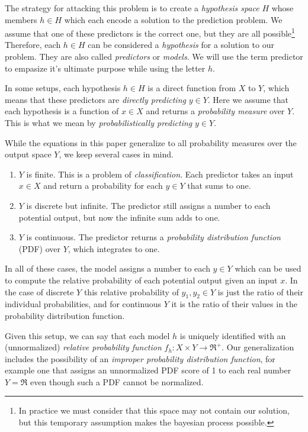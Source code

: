 \documentclass[twoside]{article}
\begin{document}
The strategy for attacking this problem is to create a \textit{hypothesis space} \(H\) whose members \(h \in H\) which each encode a solution to the prediction problem. We assume that one of these predictors is the correct one, but they are all possible\footnote{In practice we must consider that this space may not contain our solution, but this temporary assumption makes the bayesian process possible.} Therefore, each \(h \in H\) can be considered a \textit{hypothesis} for a solution to our problem. They are also called \textit{predictors} or \textit{models}. We will use the term predictor to empasize it's ultimate purpose while using the letter \(h\).

In some setups, each hypothesis \(h \in H\) is a direct function from \(X\) to \(Y\), which means that these predictors are \textit{directly predicting} \(y \in Y\). Here we assume that each hypothesis is a function of \(x \in X\) and returns a \textit{probability measure} over \(Y\). This is what we mean by \textit{probabilistically predicting} \(y \in Y\).

While the equations in this paper generalize to all probability measures over the output space \(Y\), we keep several cases in mind.
\begin{enumerate}
	\item \(Y\) is finite. This is a problem of \textit{classification}. Each predictor takes an input \(x \in X\) and return a probability for each \(y \in Y\) that sums to one.
	\item \(Y\) is discrete but infinite. The predictor still assigns a number to each potential output, but now the infinite sum adds to one.
	\item \(Y\) is continuous. The predictor returns a \textit{probability distribution function} (PDF) over \(Y\), which integrates to one.
\end{enumerate}

In all of these cases, the model assigns a number to each \(y \in Y\) which can be used to compute the relative probability of each potential output given an input \(x\). In the case of discrete \(Y\) this relative probability of \(y_1, y_2 \in Y\) is just the ratio of their individual probabilities, and for continuous \(Y\) it is the ratio of their values in the probability distribution function. 

Given this setup, we can say that each model \(h\) is uniquely identified with an (unnormalized) \textit{relative probability function} \(f_h: X \times Y \rightarrow \Re^+\). Our generalization includes the possibility of an \textit{improper probability distribution function}, for example one that assigns an unnormalized PDF score of 1 to each real number \(Y=\Re\) even though such a PDF cannot be normalized.
\end{document}

